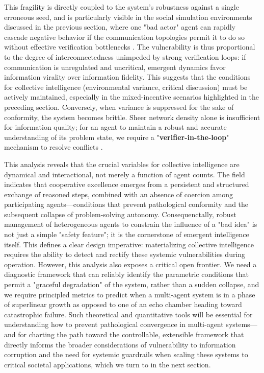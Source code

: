 \documentclass[11pt,a4paper]{article}
\begin{document}
This fragility is directly coupled to the system's robustness against a single erroneous seed, and is particularly visible in the social simulation environments discussed in the previous section, where one "bad actor" agent can rapidly cascade negative behavior if the communication topologies permit it to do so without effective verification bottlenecks \cite{arxiv:2403.08282v2,arxiv:2404.02183v1}. The vulnerability is thus proportional to the degree of interconnectedness unimpeded by strong verification loops: if communication is unregulated and uncritical, emergent dynamics favor information virality over information fidelity. This suggests that the conditions for collective intelligence (environmental variance, critical discussion) must be actively maintained, especially in the mixed-incentive scenarios highlighted in the preceding section. Conversely, when variance is suppressed for the sake of conformity, the system becomes brittle. Sheer network density alone is insufficient for information quality; for an agent to maintain a robust and accurate understanding of its problem state, we require a "\textbf{verifier-in-the-loop}" mechanism to resolve conflicts \cite{arxiv:2409.11393v1}.

This analysis reveals that the crucial variables for collective intelligence are dynamical and interactional, not merely a function of agent counts. The field indicates that cooperative excellence emerges from a persistent and structured exchange of reasoned steps, combined with an absence of coercion among participating agents---conditions that prevent pathological conformity and the subsequent collapse of problem-solving autonomy. Consequenctally, robust management of heterogeneous agents to constrain the influence of a "bad idea" is not just a simple "safety feature"; it is the cornerstone of emergent intelligence itself. This defines a clear design imperative: materializing collective intelligence requires the ability to detect and rectify these systemic vulnerabilities during operation. However, this analysis also exposes a critical open frontier. We need a diagnostic framework that can reliably identify the parametric conditions that permit a "graceful degradation" of the system, rather than a sudden collapse, and we require principled metrics to predict when a multi-agent system is in a phase of superlinear growth as opposed to one of an echo chamber heading toward catastrophic failure. Such theoretical and quantitative tools will be essential for understanding how to prevent pathological convergence in multi-agent systems---and for charting the path toward the controllable, extensible framework that directly informs the broader considerations of vulnerability to information corruption and the need for systemic guardrails when scaling these systems to critical societal applications, which we turn to in the next section.
\end{document}

